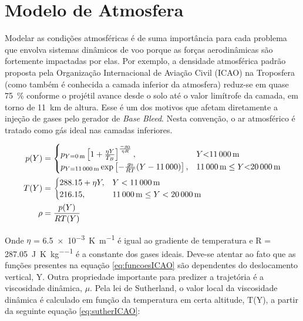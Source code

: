 \section{Modelo de Atmosfera}
\label{sec:ICAOatm}

Modelar as condições atmosféricas é de suma importância para cada problema que envolva sistemas dinâmicos de voo porque as forças aerodinâmicas são fortemente impactadas por elas. Por exemplo, a densidade atmosférica padrão proposta pela Organização Internacional de Aviação Civil (ICAO) \cite{international1993manual} na Troposfera (como também é conhecida a camada inferior da atmosfera) reduz-se em quase \qty{75}{\percent} conforme o projétil avance desde o solo até o valor limítrofe da camada, em torno de \qty{11}{\kilo\metre} de altura. Esse é um dos motivos que afetam diretamente a injeção de gases pelo gerador de \textit{Base Bleed}. Nesta convenção, o ar atmosférico é tratado como gás ideal nas camadas inferiores. 

\begin{equation}
\label{eq:funcoesICAO}
\begin{aligned}
p(Y) &=\begin{cases}
			p_{Y=\qty{0}{\metre}}\left[1 + \frac{\eta Y}{T_{B}} \right]^{\frac{-g_{0}}{\eta R}} , & Y \qty{< 11000}{\metre}\\
            p_{Y=\qty{11000}{\metre}} \exp\left[-\frac{g_{0}}{RT}(Y-\num{11000}) \right], & \qty{11000}{\metre} \leq Y \qty{< 20000}{\metre}
		 \end{cases}
\\
T(Y) &=\begin{cases}
			\num{288,15} + \eta Y, & Y < \qty{11000}{\metre}\\
            \num{216,15}, & \qty{11000}{\metre} \leq Y < \qty{20000}{\metre}
		 \end{cases}
\\
\rho &= \frac{p(Y)}{RT(Y)}
\end{aligned}
\end{equation}

Onde $\eta$ = \qty{6,5e-3}{\kelvin\per\metre} é igual ao gradiente de temperatura e R = \qty{287,05}{\joule\per\kelvin\per\kilogram} é a constante dos gases ideais. Deve-se atentar ao fato que as funções presentes na equação \ref{eq:funcoesICAO} são dependentes do deslocamento vertical, Y. Outra propriedade importante para predizer a trajetória é a viscosidade dinâmica, $\mu$. Pela lei de Sutherland, o valor local da viscosidade dinâmica é calculado em função da temperatura em certa altitude, T(Y), a partir da seguinte equação \ref{eq:sutherICAO}:

